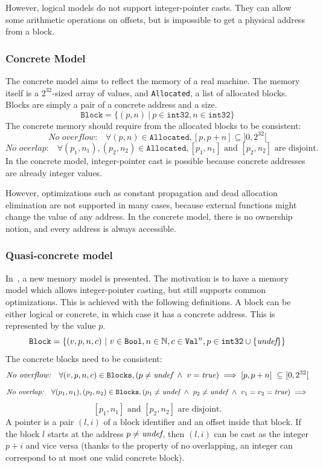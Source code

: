 However, logical models do not support integer-pointer casts. They can allow some arithmetic operations on offsets, but is impossible to get a physical address from a block.

\subsubsection{Concrete Model}
The concrete model aims to reflect the memory of a real machine.
The memory itself is a $2^{32}$-sized array of values, and \texttt{Allocated}, a list of allocated blocks.
Blocks are simply a pair of a concrete address and a size.
$$\texttt{Block}=\{(p,n)~|~p\in\texttt{int32},n\in\texttt{int32}\}$$
The concrete memory should require from the allocated blocks to be consistent:
$$\textit{No overflow:}\quad\forall (p,n)\in\texttt{Allocated}, [p,p+n]\subseteq]0,2^{32}[$$
$$\textit{No overlap:}\quad\forall (p_1,n_1), (p_2,n_2)\in\texttt{Allocated}, [p_1,n_1]\text{ and }[p_2,n_2]\text{ are disjoint.}$$
In the concrete model, integer-pointer cast is possible because concrete addresses are already integer values.

However, optimizations such as constant propagation and dead allocation elimination are not supported in many cases, because external functions might change the value of any address. In the concrete model, there is no ownership notion, and every address is always accessible.
\subsubsection{Quasi-concrete model}
In~\cite{DBLP:conf/pldi/KangHMGZV15}, a new memory model is presented. The motivation is to have a memory model which allows integer-pointer casting, but still supports common optimizations.
This is achieved with the following definitions.
A block can be either logical or concrete, in which case it has a concrete address. This is represented by the value $p$.
$$\texttt{Block}=\{(v,p,n,c)~|~v\in\texttt{Bool},n\in\mathbb{N},c\in\texttt{Val}^{n},p\in\texttt{int32}\cup\{\textit{undef}\}\}$$
The concrete blocks need to be consistent:
$$\textit{No overflow:}\quad\forall (v,p,n,c)\in\texttt{Blocks}, (p\neq\textit{undef}~\wedge~ v=\textit{true})\implies[p,p+n]~\subseteq~]0,2^{32}[$$
$$\textit{No overlap:}\quad\forall (p_1,n_1), (p_2,n_2)\in\texttt{Blocks}, (p_1\neq\textit{undef}~\wedge~p_2\neq\textit{undef} ~\wedge~ v_1=v_2=\textit{true})\implies$$ $$[p_1,n_1]\text{ and }[p_2,n_2]\text{ are disjoint.}$$
A pointer is a pair $(l,i)$ of a block identifier and an offset inside that block. If the block $l$ starts at the address $p\neq\textit{undef}$, then $(l,i)$ can be cast as the integer $p+i$ and vice versa (thanks to the property of no overlapping, an integer can correspond to at most one valid concrete block).

